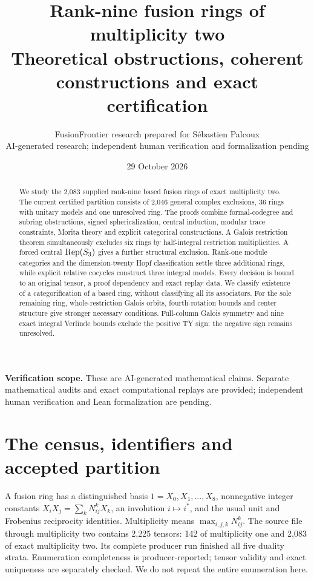 \documentclass[11pt,a4paper]{article}
\title{Rank-nine fusion rings of multiplicity two\\\large Theoretical obstructions, coherent constructions and exact certification}
\author{FusionFrontier research prepared for S\'ebastien Palcoux\\\small AI-generated research; independent human verification and formalization pending}
\date{29 October 2026}
\theoremstyle{remark}\newtheorem{remark}[theorem]{Remark}
\begin{document}
\maketitle
\begin{abstract}
We study the 2,083 supplied rank-nine based fusion rings of exact multiplicity
two. The current certified partition consists of 2,046 general complex
exclusions, 36 rings with unitary models and one unresolved ring. The proofs
combine formal-codegree and subring obstructions, signed sphericalization,
central induction, modular trace constraints, Morita theory and explicit
categorical constructions. A Galois restriction theorem simultaneously
excludes six rings by half-integral restriction multiplicities. A forced
central $\operatorname{Rep}(S_3)$ gives a further structural exclusion. Rank-one module
categories and the dimension-twenty Hopf classification settle three
additional rings, while explicit relative cocycles construct three integral
models. Every decision is bound to an original tensor, a proof dependency
and exact replay data. We classify existence of a categorification of a
based ring, without classifying all its associators. For the sole remaining
ring, whole-restriction Galois orbits, fourth-rotation bounds and center
structure give stronger necessary conditions. Full-column Galois symmetry and nine exact integral Verlinde bounds exclude the positive TY sign; the negative sign remains unresolved.
\end{abstract}
\noindent\textbf{Verification scope.} These are AI-generated mathematical
claims. Separate mathematical audits and exact computational replays are
provided; independent human verification and Lean formalization are pending.
\tableofcontents

\section{The census, identifiers and accepted partition}
A fusion ring has a distinguished basis $1=X_0,X_1,\ldots,X_8$, nonnegative
integer constants $X_iX_j=\sum_kN_{ij}^kX_k$, an involution $i\mapsto i^*$,
and the usual unit and Frobenius reciprocity identities. Multiplicity means
$\max_{i,j,k}N_{ij}^k$. The source file through multiplicity two contains
2,225 tensors: 142 of multiplicity one and 2,083 of exact multiplicity two.
Its complete producer run finished all five duality strata. Enumeration
completeness is producer-reported; tensor validity and exact uniqueness are
separately checked. We do not repeat the entire enumeration here.
\end{document}

